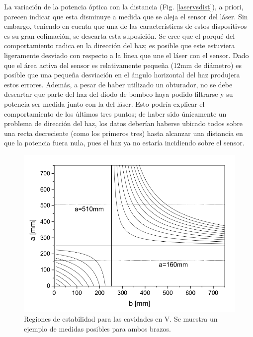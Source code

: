 \documentclass[10pt, a4paper]{article}%
\begin{document}
\begin{multicols}{2}
La variación de la potencia óptica con la distancia (Fig. \ref{laservsdist}), a priori, parecen indicar que esta disminuye a medida que se aleja el sensor del láser. Sin embargo, teniendo en cuenta que una de las características de estos dispositivos es su gran colimación, se descarta esta suposición. Se cree que el porqué del comportamiento radica en la dirección del haz; es posible que este estuviera ligeramente desviado con respecto a la línea que une el láser con el sensor. Dado que el área activa del sensor es relativamente pequeña (12mm de diámetro) es posible que una pequeña desviación en el ángulo horizontal del haz produjera estos errores. Además, a pesar de haber utilizado un obturador, no se debe descartar que parte del haz del diodo de bombeo haya podido filtrarse y su potencia ser medida junto con la del láser. Esto podría explicar el comportamiento de los últimos tres puntos; de haber sido únicamente un problema de dirección del haz, los datos deberían haberse ubicado todos sobre una recta decreciente (como los primeros tres) hasta alcanzar una distancia en que la potencia fuera nula, pues el haz ya no estaría incidiendo sobre el sensor. 

\begin{figure}[H]
    \centering
    \includegraphics[scale=0.27]{Graficos/estabilidad.png}
    \caption{Regiones de estabilidad para las cavidades en V. Se muestra un ejemplo de medidas posibles para ambos brazos.}
    \label{estabilidad}
\end{figure}


\end{multicols}
\end{document}
